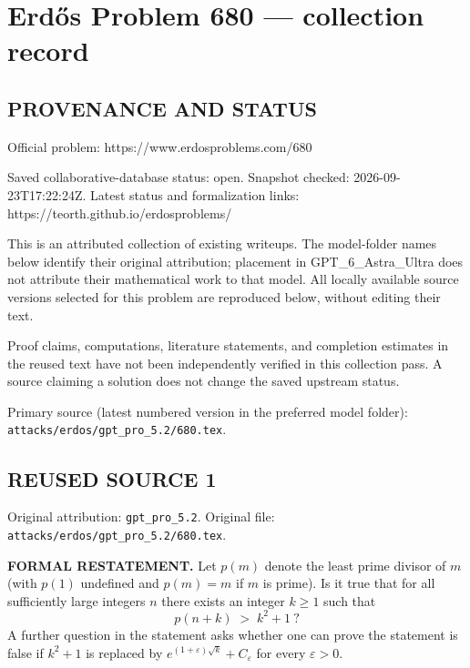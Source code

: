 \section*{Erd\H{o}s Problem 680 --- collection record}

\subsection*{PROVENANCE AND STATUS}
Official problem: https://www.erdosproblems.com/680

Saved collaborative-database status: open.
Snapshot checked: 2026-09-23T17:22:24Z.
Latest status and formalization links: https://teorth.github.io/erdosproblems/

This is an attributed collection of existing writeups. The model-folder names below identify their original attribution; placement in GPT\_6\_Astra\_Ultra does not attribute their mathematical work to that model. All locally available source versions selected for this problem are reproduced below, without editing their text.

Proof claims, computations, literature statements, and completion estimates in the reused text have not been independently verified in this collection pass. A source claiming a solution does not change the saved upstream status.

Primary source (latest numbered version in the preferred model folder): \texttt{attacks/erdos/gpt\_pro\_5.2/680.tex}.

\subsection*{REUSED SOURCE 1}
Original attribution: \texttt{gpt\_pro\_5.2}.
Original file: \texttt{attacks/erdos/gpt\_pro\_5.2/680.tex}.

\item
\textbf{FORMAL RESTATEMENT.}
Let $p(m)$ denote the least prime divisor of $m$ (with $p(1)$ undefined and $p(m)=m$ if $m$ is prime). Is it true that for all sufficiently large integers $n$ there exists an integer $k\ge1$ such that
\[
p(n+k)\;>\;k^{2}+1\ ?
\]
A further question in the statement asks whether one can prove the statement is false if $k^{2}+1$ is replaced by $e^{(1+\varepsilon)\sqrt{k}}+C_{\varepsilon}$ for every $\varepsilon>0$.

